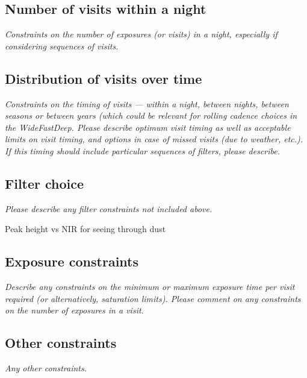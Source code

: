 \documentclass[11pt]{article}
\begin{document}
\subsection{Number of visits within a night}
\begin{footnotesize}{\it Constraints on the number of exposures (or visits) in a night, especially if considering sequences of visits.  }
\end{footnotesize}

\subsection{Distribution of visits over time}
\begin{footnotesize}{\it Constraints on the timing of visits --- within a night, between nights, between seasons or
between years (which could be relevant for rolling cadence choices in the WideFastDeep. 
Please describe optimum visit timing as well as acceptable limits on visit timing, and options in
case of missed visits (due to weather, etc.). If this timing should include particular sequences
of filters, please describe.}
\end{footnotesize}

\subsection{Filter choice}
\begin{footnotesize}
{\it Please describe any filter constraints not included above.}
\end{footnotesize}

Peak height vs NIR for seeing through dust

\subsection{Exposure constraints}
\begin{footnotesize}
{\it Describe any constraints on the minimum or maximum exposure time per visit required (or alternatively, saturation limits).
Please comment on any constraints on the number of exposures in a visit.}
\end{footnotesize}

\subsection{Other constraints}
\begin{footnotesize}
{\it Any other constraints.}
\end{footnotesize}
\end{document}
